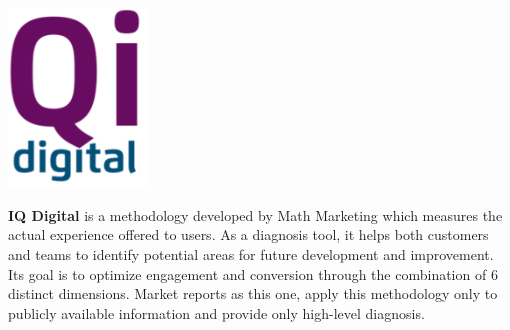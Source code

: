 \newpage

\begin{minipage}{0.35\linewidth} %
\includegraphics[width=3.7cm]{images/iq.png}\\
\end{minipage}
%
\begin{minipage}{0.65\linewidth}
\LARGE\color{DarkPurple}\textbf{IQ Digital} 
\large{is a methodology developed by Math Marketing which measures the actual experience offered to users. As a diagnosis tool, it helps both customers and teams to identify potential areas for future development and improvement. Its goal is to optimize engagement and conversion through the combination of 6 distinct dimensions. Market reports as this one, apply this methodology only to publicly available information and provide only high-level diagnosis.}
\end{minipage}

\vspace{1cm}

